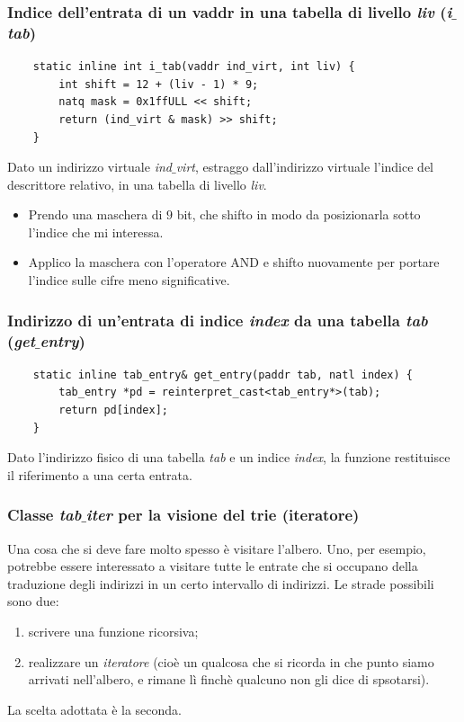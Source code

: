 \subsubsection{Indice dell'entrata di un vaddr in una tabella di livello \emph{liv}	 (\emph{i$\_$tab})}
\small 
\begin{verbatim}
	static inline int i_tab(vaddr ind_virt, int liv) {
		int shift = 12 + (liv - 1) * 9;
		natq mask = 0x1ffULL << shift;
		return (ind_virt & mask) >> shift;
	}
\end{verbatim}
\normalsize 
Dato un indirizzo virtuale \emph{ind$\_$virt}, estraggo dall'indirizzo virtuale l'indice del descrittore relativo, in una tabella di livello \emph{liv}.
\begin{itemize}
	\item Prendo una maschera di $9$ bit, che shifto in modo da posizionarla sotto l'indice che mi interessa.
	\item Applico la maschera con l'operatore AND e shifto nuovamente per portare l'indice sulle cifre meno significative.
\end{itemize}

\subsubsection{Indirizzo di un'entrata di indice \emph{index} da una tabella \emph{tab} (\emph{get$\_$entry})}
\small
\begin{verbatim}
	static inline tab_entry& get_entry(paddr tab, natl index) {
		tab_entry *pd = reinterpret_cast<tab_entry*>(tab);
		return pd[index];
	}
\end{verbatim}
\normalsize 
Dato l'indirizzo fisico di una tabella \emph{tab} e un indice \emph{index}, la funzione restituisce il riferimento a una certa entrata.

\subsubsection{Classe \emph{tab$\_$iter} per la visione del trie (iteratore)}
Una cosa che si deve fare molto spesso è visitare l'albero. Uno, per esempio, potrebbe essere interessato a visitare tutte le entrate che si occupano della traduzione degli indirizzi in un certo intervallo di indirizzi. Le strade possibili sono due:
\begin{enumerate}
	\item scrivere una funzione ricorsiva;
	\item realizzare un \emph{iteratore} (cioè un qualcosa che si ricorda in che punto siamo arrivati nell'albero, e rimane lì finchè qualcuno non gli dice di spsotarsi).
\end{enumerate}
{La scelta adottata è la seconda}.
